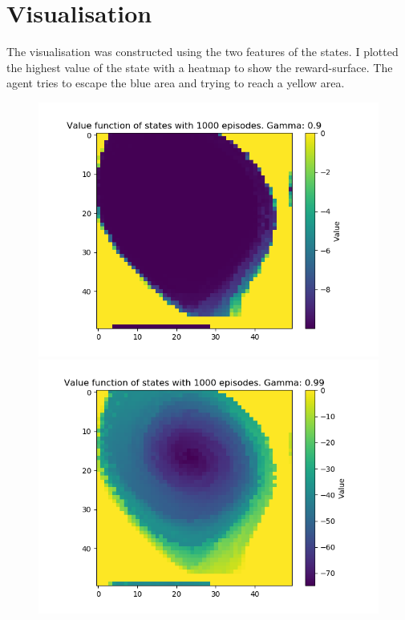 \documentclass[a4paper]{article}
\begin{document}
\section{Visualisation}
The visualisation was constructed using the two features of the states. I plotted the highest value of the state with a heatmap to show the reward-surface. The agent tries to escape the blue area and trying to reach a yellow area. 


\begin{figure}
  \includegraphics[width=\linewidth]{"gamma 09"}
\endminipage\hfill
{}
  \includegraphics[width=\linewidth]{"gamma 099"}
\endminipage\hfill
\end{figure}
\end{document}
